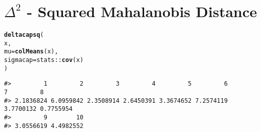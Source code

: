 \documentclass{article}\usepackage[]{graphicx}\usepackage[]{color}
\makeatletter
\newcommand{\hlopt}[1]{\textcolor[rgb]{0,0,0}{#1}}%
\newcommand{\hlstd}[1]{\textcolor[rgb]{0.345,0.345,0.345}{#1}}%
\newcommand{\hlkwc}[1]{\textcolor[rgb]{0.333,0.667,0.333}{#1}}%
\newcommand{\hlkwd}[1]{\textcolor[rgb]{0.737,0.353,0.396}{\textbf{#1}}}%
\newenvironment{kframe}{%
 \def\at@end@of@kframe{}%
 \ifinner\ifhmode%
  \def\at@end@of@kframe{\end{minipage}}%
  \begin{minipage}{\columnwidth}%
 \fi\fi%
 \def\FrameCommand##1{\hskip\@totalleftmargin \hskip-\fboxsep
 \colorbox{shadecolor}{##1}\hskip-\fboxsep
     \hskip-\linewidth \hskip-\@totalleftmargin \hskip\columnwidth}%
 \MakeFramed {\advance\hsize-\width
   \@totalleftmargin\z@ \linewidth\hsize
   \@setminipage}}%
 {\par\unskip\endMakeFramed%
 \at@end@of@kframe}
\newenvironment{knitrout}{}{} %
\makeatother
\begin{document}
\section*{$\Delta^2$ - Squared Mahalanobis Distance}







\begin{knitrout}
\color{fgcolor}\begin{kframe}
\begin{alltt}
\hlkwd{deltacapsq}\hlstd{(}
  \hlstd{x,}
  \hlkwc{mu}  \hlstd{=} \hlkwd{colMeans}\hlstd{(x),}
  \hlkwc{sigmacap} \hlstd{= stats}\hlopt{::}\hlkwd{cov}\hlstd{(x)}
\hlstd{)}
\end{alltt}
\begin{verbatim}
#>         1         2         3         4         5         6         7         8 
#> 2.1836824 6.0959842 2.3508914 2.6450391 3.3674652 7.2574119 3.7700132 0.7755954 
#>         9        10 
#> 3.0556619 4.4982552
\end{verbatim}
\end{kframe}
\end{knitrout}

\nocite{R-2021}

\printbibliography
\end{document}
